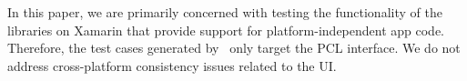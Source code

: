 
In this paper, we are primarily concerned with testing the functionality of the
libraries on Xamarin that provide support for platform-independent app code.
Therefore, the test cases generated by \tool\ only target the PCL interface. We
do not address cross-platform consistency issues related to the UI.







